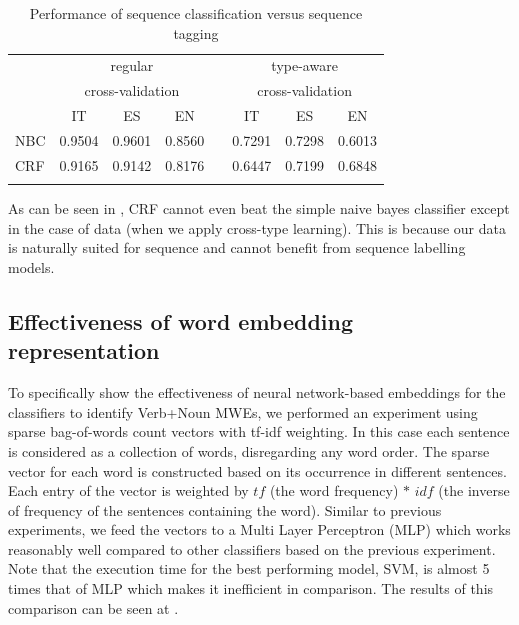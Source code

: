 \documentclass[output=paper
,modfonts
,nonflat]{langsci/langscibook}
\begin{document}
\begin{table}[!ht]
\small
\caption{Performance of sequence classification versus sequence tagging}
\label{tab:seqLabel}
 \begin{tabular}{lccccccc} 
  \lsptoprule

   & \multicolumn{3}{c}{regular}  & & \multicolumn{3}{c}{type-aware %
   } \\
   & \multicolumn{3}{c}{cross-validation} & & \multicolumn{3}{c}{cross-validation} \\
   \midrule
   & IT & ES & EN & & IT & ES & EN \\
 NBC  &  0.9504 & 0.9601 & 0.8560 & & 0.7291 & 0.7298 & 0.6013 \\
 CRF  &  0.9165 & 0.9142 & 0.8176 & & 0.6447 & 0.7199 & 0.6848 \\
  \lspbottomrule
 \end{tabular}
\end{table}

As can be seen in , CRF cannot even beat the simple naive bayes classifier except in the case of  data (when we apply cross-type learning). This is because our data is naturally suited for sequence  and cannot benefit from sequence labelling models.

\subsection{Effectiveness of word embedding representation}
\label{s:wv-res}
To specifically show the effectiveness of neural network-based embeddings for the classifiers to identify Verb+Noun MWEs, we performed an experiment using sparse bag-of-words count vectors with tf-idf weighting. In this case each sentence is considered as a collection of words, disregarding any word order. The sparse vector for each word is constructed based on its occurrence in different sentences. Each entry of the vector is weighted by $tf$ (the word frequency) $*$ $idf$ (the inverse of frequency of the sentences containing the word). Similar to previous experiments, we feed the vectors to a Multi Layer Perceptron (MLP) which works reasonably well compared to other classifiers based on the previous experiment. Note that the execution time for the best performing model, SVM, is almost 5 times that of MLP which makes it inefficient in comparison. The results of this comparison can be seen at .
\end{document}
